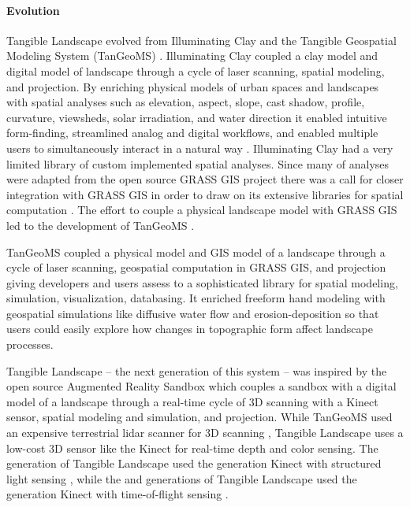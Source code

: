 \documentclass[prodmode,acmtochi]{acmsmall} %
\begin{document}
\paragraph{Evolution}
%
Tangible Landscape evolved from 
Illuminating Clay \cite{Piper2002a} and 
the Tangible Geospatial Modeling System (TanGeoMS) \cite{Tateosian2010}. 
%
Illuminating Clay coupled a clay model and digital model of landscape 
through a cycle of laser scanning, spatial modeling, and projection.
%
By enriching physical models of urban spaces and landscapes 
with spatial analyses  
such as 
elevation, aspect, slope, cast shadow, profile, curvature, 
viewsheds, solar irradiation, and water direction
it enabled
intuitive form-finding, 
streamlined analog and digital workflows, 
and enabled multiple users to simultaneously interact in a natural way \cite{Ratti2004}. 
%
Illuminating Clay had a very limited library of custom implemented spatial analyses. 
%
Since many of analyses were adapted 
from the open source GRASS GIS project \cite{Piper2002a} 
there was a call for closer integration with GRASS GIS 
in order to draw on its extensive libraries 
for spatial computation \cite{Piper2002b}. 
%
The effort to couple a physical landscape model with GRASS GIS \cite{Mitasova2006} 
led to the development of 
TanGeoMS \cite{Tateosian2010}.

TanGeoMS coupled a physical model and GIS model of a landscape 
through a cycle of laser scanning, geospatial computation in GRASS GIS, and projection
giving developers and users assess to 
a sophisticated library for 
spatial modeling, simulation, visualization, databasing.
%
It enriched freeform hand modeling with geospatial simulations like diffusive water flow and erosion-deposition 
so that users could easily explore how 
changes in topographic form affect landscape processes. 

Tangible Landscape -- the next generation of this system -- was inspired by
the open source Augmented Reality Sandbox \cite{Kreylos2012}
which couples a sandbox with a digital model of a landscape 
through a real-time cycle of 3D scanning with a Kinect sensor, spatial modeling and simulation, and projection.
%
While TanGeoMS used an expensive terrestrial lidar scanner for 3D scanning \cite{Tateosian2010}, 
Tangible Landscape uses a low-cost 3D sensor like the Kinect 
for real-time depth and color sensing. 
%
The  generation of Tangible Landscape \cite{Petrasova2014} 
used the  generation Kinect with structured light sensing \cite{Smisek2011}, 
while the   \cite{Petrasova2015} and  generations of Tangible Landscape 
used the  generation Kinect with time-of-flight sensing \cite{Bamji2015} . 
\end{document}
